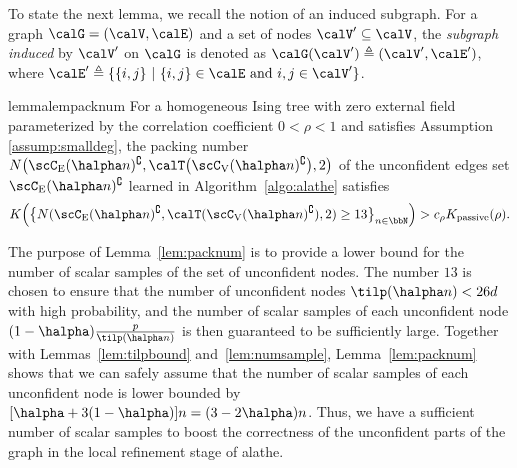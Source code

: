 \documentclass[11pt,onecolumn]{article}
\newcommand{\Passive}{{\rm passive}}
\begin{document}
To state the next lemma, we recall the notion of an induced subgraph. For a graph $\calG=(\calV,\calE)$ and a set of nodes $\calV^{\prime}\subseteq \calV$, the  {\em subgraph induced} by $\calV^{\prime}$ on $\calG$ is   denoted as $\calG(\calV^{\prime}) \triangleq (\calV^{\prime},\calE^{\prime})$, where 
$\calE^{\prime}\triangleq\{\{i,j\}\ | \ \{i,j\}\in \calE \text{ and }i,j\in\calV^{\prime}\}$. 

\begin{restatable}{lemma}{lempacknum}
\label{lem:packnum}
For a homogeneous Ising tree with zero external field  parameterized by the correlation coefficient $0<\rho<1$ and satisfies Assumption \ref{assump:smalldeg}, the packing number $N\big(\scC_{\mathrm{E}}(\halpha n)^{\complement},\calT\big(\scC_{\mathrm{V}}(\halpha n)^{\complement}\big),2\big)$ of the unconfident edges set $\scC_{\mathrm{E}}(\halpha n)^{\complement}$ 
learned in Algorithm~\ref{algo:alathe} satisfies
\begin{align}
	K\Big(\big\{N(\scC_{\mathrm{E}}(\halpha n)^{\complement},\calT(\scC_{\mathrm{V}}(\halpha n)^{\complement}),2)\geq 13\big\}_{n\in\bbN}\Big)>c_{\rho}K _{\Passive}(\rho).
\end{align}
\end{restatable}
The purpose of Lemma~\ref{lem:packnum} is to provide a lower bound for the number of scalar samples of the set of unconfident nodes. The number $13$ is chosen to ensure that the number of unconfident nodes $\tilp(\halpha n)<26d$ with high probability, and the number of scalar samples of each unconfident node $(1-\halpha)\frac{p}{\tilp(\halpha n)}$ is then guaranteed to be sufficiently large. Together with Lemmas~\ref{lem:tilpbound} and~\ref{lem:numsample}, Lemma~\ref{lem:packnum} shows that we can safely assume   that the number of scalar samples of each unconfident node is lower bounded by $[\halpha+3(1-\halpha)]n=(3-2\halpha)n$. Thus, we have a sufficient number of scalar samples to boost the correctness of the unconfident parts of the graph in the local refinement stage of \ac{alathe}. 
\end{document}

